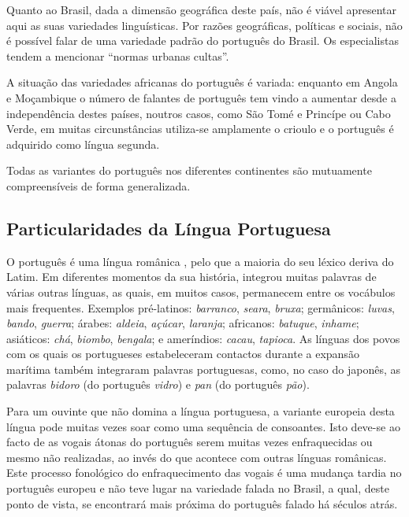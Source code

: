 \begin{multicols}{2}
Quanto ao Brasil, dada a dimensão geográfica deste país, não é viável apresentar aqui as suas variedades linguísticas. Por razões geográficas, políticas e sociais, não é possível falar de uma variedade padrão do português do Brasil. Os especialistas tendem a mencionar “normas urbanas cultas”. 

A situação das variedades africanas do português é variada: enquanto em Angola e Moçambique o número de falantes de português tem vindo a aumentar desde a independência destes países, noutros casos, como São Tomé e Princípe ou Cabo Verde, em muitas circunstâncias utiliza-se amplamente o crioulo e o português é adquirido como língua segunda.

Todas as variantes do português nos diferentes continentes são mutuamente compreensíveis de forma generalizada.


\subsection{Particularidades da Língua Portuguesa}

O português é uma língua românica \cite{cardeira}, pelo que a maioria do seu léxico deriva do Latim. 
Em diferentes momentos da sua história, integrou muitas palavras de várias outras línguas,  as quais, em muitos casos, permanecem entre os vocábulos mais frequentes. Exemplos pré-latinos: \textit{barranco}, \textit{seara}, \textit{bruxa}; germânicos: \textit{luvas}, \textit{bando}, \textit{guerra}; árabes: \textit{aldeia}, \textit{açúcar}, \textit{laranja}; africanos: \textit{batuque}, \textit{i\-nha\-me}; asiáticos: \textit{chá}, \textit{biombo}, \textit{bengala}; e ameríndios: \textit{cacau}, \textit{tapioca}. As línguas dos povos com os quais os portugueses estabeleceram contactos durante a expansão marítima também integraram palavras portuguesas, como, no caso do japonês, as palavras \textit{bidoro} (do português \textit{vidro}) e \textit{pan} (do português \textit{pão}).

Para um ouvinte que não domina a língua portuguesa, a variante europeia desta língua pode muitas vezes soar como uma sequência de consoantes. 
Isto deve-se ao facto de as vogais átonas do português serem muitas vezes enfraquecidas ou mesmo não realizadas, ao invés
do que acontece com outras línguas românicas. 
Este processo fonológico do enfraquecimento das vogais é uma mudança tardia no português europeu 
e não teve lugar na variedade falada no Brasil, a qual, deste ponto de vista, se encontrará mais próxima
do português falado há séculos atrás.


\end{multicols}
